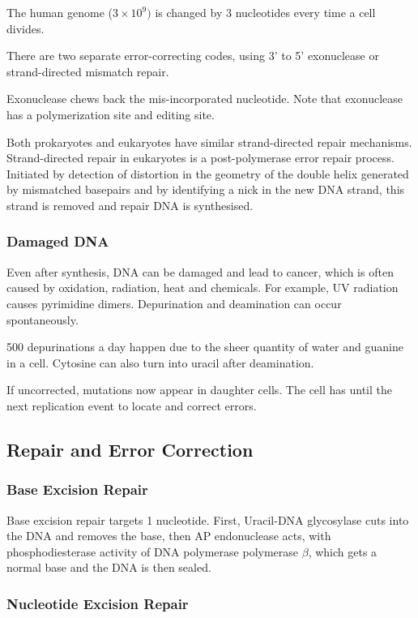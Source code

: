 \documentclass[11pt]{scrartcl}
\begin{document}
  The human genome ($3\times 10^{9})$ is changed by 3 nucleotides
  every time a cell divides.

  There are two separate error-correcting codes, using 3' to 5'
  exonuclease or strand-directed mismatch repair.

  Exonuclease chews back the mis-incorporated nucleotide. Note that
  exonuclease has a polymerization site and editing site.

  Both prokaryotes and eukaryotes have similar strand-directed repair
  mechanisms. Strand-directed repair in eukaryotes is a
  post-polymerase error repair process. Initiated by detection of
  distortion in the geometry of the double helix generated by
  mismatched basepairs and by identifying a nick in the new DNA
  strand, this strand is removed and repair DNA is synthesised.

  \subsubsection{Damaged DNA}

  Even after synthesis, DNA can be damaged and lead to cancer, which is often caused by oxidation, radiation, heat and chemicals. For example, UV radiation causes pyrimidine dimers. Depurination and deamination can occur spontaneously.

  500 depurinations a day happen due to the sheer quantity of water and guanine in a cell. Cytosine can also turn into uracil after deamination.

  If uncorrected, mutations now appear in daughter cells. The cell has until the next replication event to locate and correct errors.
  \subsection{Repair and Error Correction}

  \subsubsection{Base Excision Repair}

  Base excision repair targets 1 nucleotide. First, Uracil-DNA glycosylase cuts into the DNA and removes the base, then AP endonuclease acts, with phosphodiesterase activity of DNA polymerase polymerase $\beta$, which gets a normal base and the DNA is then sealed.

  \subsubsection{Nucleotide Excision Repair}
\end{document}
